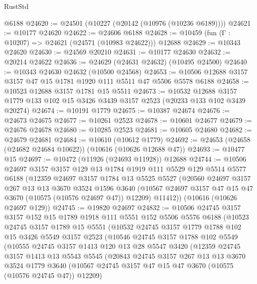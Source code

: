 \begin{lexlean}{RustStd}
\begin{coremodule}
    @6188
@24620 := @24501 (@10227 (@20142 (@10976 (@10236 @6189))))
@24621 := @10177 @24620
@24622 := @24606 @6188
@24628 := @10459 (fun (Γ : @10207) => @24621 (@24571 (@10983 @24622))) @12688
@24629 := @10343 @24620
@24630 := @24569 @20210
@24631 := @10177 @24630
@24632 := @20214 @24622
@24636 := @24629 (@24631 @24632) (@10495 @24500)
@24640 := @10343 @24630 @24632 (@10500 @24568)
@24653 := @10506 @12688 @3157 @3157 @47 @15 @1781 @1920 @111 @5511 @47 @5506 @5578 @6188
@24658 := @10523 @12688 @3157 @1781 @15 @5511
@24673 := @10532
    @12688
    @3157
    @1779
    @133
    @102
    @15
    @3426
    @3439
    @3157
    @2523
    (@20233 @133 @102 @3439 @20274)
@24674 := @10191 @1779
@24675 := @10387 @24674
@24676 := @24673 @24675
@24677 := @10261 @2523
@24678 := @10601 @24677
@24679 := @24676 @24678
@24680 := @10285 @2523
@24681 := @10605 @24680
@24682 := @24679 @24681
@24684 := @10610 (@10612 @1779)
@24692 := @24653 (@24658 (@24682 @24684 @10622)) (@10616 (@10626 @12688 @47))
@24693 := @10477 @15
@24697 := @10472 (@11926 (@24693 @11928)) @12688
@24744 := @10506
    @24697
    @3157
    @3157
    @129
    @13
    @1784
    @1919
    @111
    @5529
    @129
    @5514
    @5577
    @6188
    (@12359
      @24697
      @3157
      @1784
      @13
      @5525
      @5527
      (@20560
        @24697
        @3157
        @267
        @13
        @13
        @3670
        @3524
        @1596
        @3640
        (@10567 @24697 @3157 @47 @15 @47 @3670 (@10575 (@10576 @24697 @47)) @12209)
        @11412))
    (@10616 (@10626 @24697 @129))
@24745 := @19820 @24697
@24832 := @10506
    @24745
    @3157
    @3157
    @152
    @15
    @1789
    @1918
    @111
    @5551
    @152
    @5506
    @5576
    @6188
    (@10523
      @24745
      @3157
      @1789
      @15
      @5551
      (@10532
        @24745
        @3157
        @1779
        @1788
        @102
        @15
        @3426
        @5549
        @3157
        @2523
        (@10546
          @24745
          @3157
          @1788
          @102
          @5549
          (@10555
            @24745
            @3157
            @1413
            @120
            @13
            @28
            @5547
            @3420
            (@12359
              @24745
              @3157
              @1413
              @13
              @5543
              @5545
              (@20843
                @24745
                @3157
                @267
                @13
                @13
                @3670
                @3524
                @1779
                @3640
                (@10567 @24745 @3157 @47 @15 @47 @3670 (@10575 (@10576 @24745 @47)) @12209)

\end{coremodule}
\end{lexlean}
